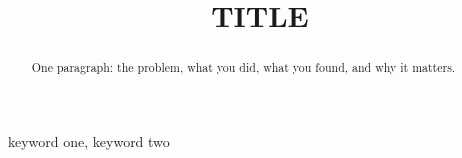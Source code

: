 \documentclass[conference]{IEEEtran}
\begin{document}
\title{{{TITLE}}}

\author{
\and
{}
}

\maketitle

\begin{abstract}
One paragraph: the problem, what you did, what you found, and why it matters.
\end{abstract}

\begin{IEEEkeywords}
keyword one, keyword two
\end{IEEEkeywords}






\end{document}
